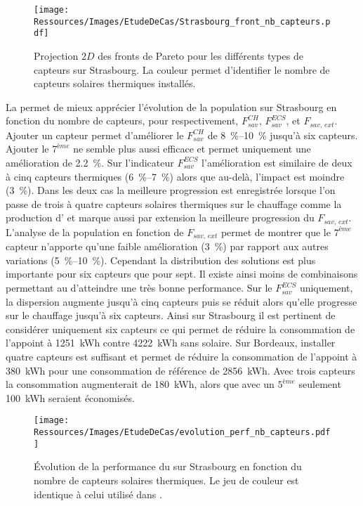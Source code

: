 \begin{figure}
    \centering
    \texttt{[image: Ressources/Images/EtudeDeCas/Strasbourg\_front\_nb\_capteurs.pdf]}
    \caption[Fronts de Pareto pour les différents types de capteurs sur Strasbourg]
             {Projection $2D$ des fronts de Pareto pour les différents types de capteurs sur Strasbourg.
             La couleur permet d’identifier le nombre de capteurs solaires thermiques installés.}
    \label{fig:front_pareto_nb_th}
\end{figure}


La  permet de mieux apprécier l’évolution de la
population sur Strasbourg en fonction du nombre de capteurs, pour respectivement, $F_{sav}^{CH}$,
$F_{sav}^{ECS}$, et $F_{sav,\, ext}$. Ajouter un capteur permet d’améliorer le
$F_{sav}^{CH}$ de \SIrange{8}{10}{\percent} jusqu’à six capteurs. Ajouter le $7^{ème}$ ne
semble plus aussi efficace et permet uniquement une amélioration de \SI{2.2}{\percent}. Sur
l’indicateur $F_{sav}^{ECS}$ l’amélioration est similaire de deux à cinq capteurs thermiques
(\SIrange{6}{7}{\percent}) alors que au-delà, l’impact est moindre (\SI{3}{\percent}).
Dans les deux cas la meilleure progression est enregistrée lorsque l’on passe de trois à quatre
capteurs solaires thermiques sur le chauffage comme la production d’ et marque
aussi par extension la meilleure progression du $F_{sav,\, ext}$. L’analyse de la
population en fonction de $F_{sav,\, ext}$ permet de montrer que le $7^{ème}$ capteur
n’apporte qu’une faible amélioration (\SI{3}{\percent}) par rapport aux autres variations
(\SIrange{5}{10}{\percent}). Cependant la distribution des solutions est plus importante
pour six capteurs que pour sept. Il existe ainsi moins de combinaisons permettant au
 d’atteindre une très bonne performance. Sur le $F_{sav}^{ECS}$ uniquement, la
dispersion augmente jusqu’à cinq capteurs puis se réduit alors qu’elle progresse sur le
chauffage jusqu’à six capteurs. Ainsi sur Strasbourg il est pertinent de considérer
uniquement six capteurs ce qui permet de réduire la consommation de l’appoint à
\SI{1251}{kWh} contre \SI{4222}{kWh} sans solaire. Sur Bordeaux, installer quatre capteurs
est suffisant et permet de réduire la consommation de l’appoint à \SI{380}{kWh} pour une
consommation de référence de \SI{2856}{kWh}. Avec trois capteurs la consommation
augmenterait de \SI{180}{kWh}, alors que avec un $5^{ème}$ seulement \SI{100}{kWh} seraient
économisés.

\begin{figure}
    \centering
    \texttt{[image: Ressources/Images/EtudeDeCas/evolution\_perf\_nb\_capteurs.pdf]}
    \caption[Performance du  sur Strasbourg en fonction du nombre de capteurs solaires thermiques]
             {Évolution de la performance du  sur Strasbourg en fonction du nombre de capteurs solaires thermiques.
              Le jeu de couleur est identique à celui utilisé dans .}
    \label{fig:perf_nb_th}
\end{figure}


